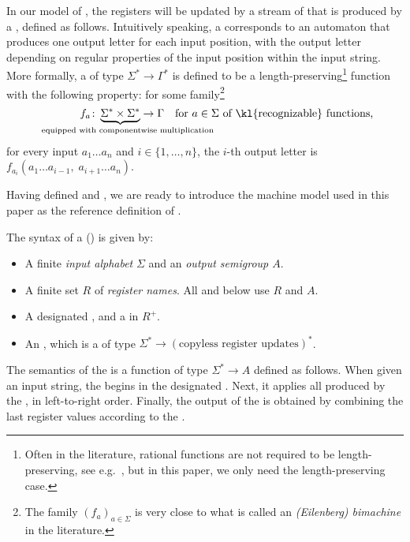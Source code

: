 \AP In our model of , the registers will be updated by a
stream of  that is produced by a , defined as
follows. Intuitively speaking, a  corresponds to an automaton
that produces one output letter for each input position, with the output letter
depending on regular properties of the input position within the input string.
More formally, a  of type $\Sigma^* \to \Gamma^*$ is
defined to be a length-preserving\footnote{Often in the literature, rational
  functions are not required to be length-preserving, see
  e.g.~\cite[p.~525]{sakarovitch2009elements}, but in this paper, we only need
  the length-preserving case.} function with the following property: for some family\footnote{The family $(f_a)_{a\in\Sigma}$ is very close to what is called an \emph{(Eilenberg) bimachine} in the literature.}
\[ \qquad\qquad f_a \colon \myunderbrace{\Sigma^* \times \Sigma^*}{\qquad equipped with componentwise multiplication} \to \Gamma\quad \text{for $a \in \Sigma$ of \kl{recognizable} functions,} \]
for every input $a_1 \dots a_n$ and $i\in\{1,\dots,n\}$, the $i$-th output letter is $f_{a_i}(a_1 \dots a_{i-1},\; a_{i+1} \dots a_n)$.

\AP Having defined  and , we are ready to introduce the machine model used in this paper as the reference definition of .

\begin{definition}\label{def:usual-sst}
    The syntax of a  (\sst) is given by:
\begin{itemize}
    \item A finite \emph{input alphabet} $\Sigma$ and an \emph{output semigroup $A$}.
    \item A finite set $R$ of \emph{register names}. All  and  below use $R$ and $A$.
    \item A designated , and a  in $R^+$.
    \item An , which is a  of type 
        $\Sigma^* \to (\text{copyless register updates})^*$.
\end{itemize}
\end{definition}
The semantics of the \sst{} is a function of type $\Sigma^* \to A$ defined as follows. When given an input string, the \sst{} begins in the designated . Next, it applies all  produced by the , in left-to-right order. Finally, the output of the \sst{} is obtained by combining the last register values according to the .

